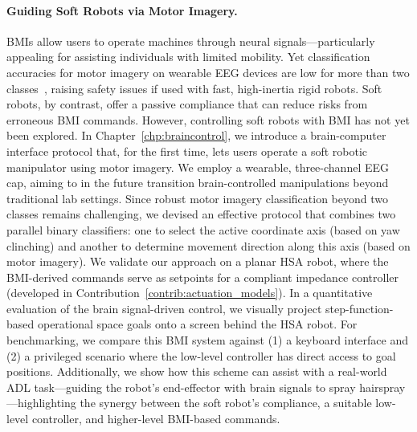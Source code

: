 \paragraph{Guiding Soft Robots via Motor Imagery.}
\glspl{BMI} allow users to operate machines through neural signals—particularly appealing for assisting individuals with limited mobility. Yet classification accuracies for motor imagery on wearable EEG devices are low for more than two classes~\citep{arpaia2022non, lee2024noir}, raising safety issues if used with fast, high-inertia rigid robots. Soft robots, by contrast, offer a passive compliance that can reduce risks from erroneous \gls{BMI} commands. However, controlling soft robots with \gls{BMI} has not yet been explored.
%
In Chapter~\ref{chp:braincontrol}, we introduce a brain-computer interface protocol that, for the first time, lets users operate a soft robotic manipulator using motor imagery. We employ a wearable, three-channel \gls{EEG} cap, aiming to in the future transition brain-controlled manipulations beyond traditional lab settings. Since robust motor imagery classification beyond two classes remains challenging, we devised an effective protocol that combines two parallel binary classifiers: one to select the active coordinate axis (based on yaw clinching) and another to determine movement direction along this axis (based on motor imagery). We validate our approach on a planar \gls{HSA} robot, where the \gls{BMI}-derived commands serve as setpoints for a compliant impedance controller (developed in Contribution~\ref{contrib:actuation_models}).
In a quantitative evaluation of the brain signal-driven control, we visually project step-function-based operational space goals onto a screen behind the \gls{HSA} robot.
% 
For benchmarking, we compare this \gls{BMI} system against (1) a keyboard interface and (2) a privileged scenario where the low-level controller has direct access to goal positions. Additionally, we show how this scheme can assist with a real-world \gls{ADL} task—guiding the robot’s end-effector with brain signals to spray hairspray—highlighting the synergy between the soft robot’s compliance, a suitable low-level controller, and higher-level \gls{BMI}-based commands.


